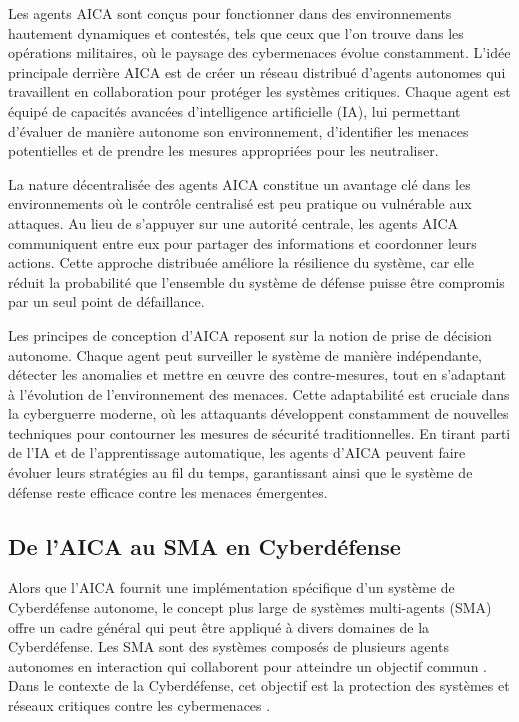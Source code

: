 Les agents AICA sont conçus pour fonctionner dans des environnements hautement dynamiques et contestés, tels que ceux que l'on trouve dans les opérations militaires, où le paysage des cybermenaces évolue constamment. L'idée principale derrière AICA est de créer un réseau distribué d'agents autonomes qui travaillent en collaboration pour protéger les systèmes critiques. Chaque agent est équipé de capacités avancées d'intelligence artificielle (IA), lui permettant d'évaluer de manière autonome son environnement, d'identifier les menaces potentielles et de prendre les mesures appropriées pour les neutraliser.

La nature décentralisée des agents AICA constitue un avantage clé dans les environnements où le contrôle centralisé est peu pratique ou vulnérable aux attaques. Au lieu de s'appuyer sur une autorité centrale, les agents AICA communiquent entre eux pour partager des informations et coordonner leurs actions. Cette approche distribuée améliore la résilience du système, car elle réduit la probabilité que l'ensemble du système de défense puisse être compromis par un seul point de défaillance.

Les principes de conception d'AICA reposent sur la notion de prise de décision autonome. Chaque agent peut surveiller le système de manière indépendante, détecter les anomalies et mettre en œuvre des contre-mesures, tout en s'adaptant à l'évolution de l'environnement des menaces. Cette adaptabilité est cruciale dans la cyberguerre moderne, où les attaquants développent constamment de nouvelles techniques pour contourner les mesures de sécurité traditionnelles. En tirant parti de l'IA et de l'apprentissage automatique, les agents d'AICA peuvent faire évoluer leurs stratégies au fil du temps, garantissant ainsi que le système de défense reste efficace contre les menaces émergentes.

\subsection{De l'AICA au SMA en Cyberdéfense}

Alors que l'AICA fournit une implémentation spécifique d'un système de Cyberdéfense autonome, le concept plus large de systèmes multi-agents (SMA) offre un cadre général qui peut être appliqué à divers domaines de la Cyberdéfense. Les SMA sont des systèmes composés de plusieurs agents autonomes en interaction qui collaborent pour atteindre un objectif commun \cite{kott2018towards}. Dans le contexte de la Cyberdéfense, cet objectif est la protection des systèmes et réseaux critiques contre les cybermenaces \cite{jajodia2017autonomous}.

